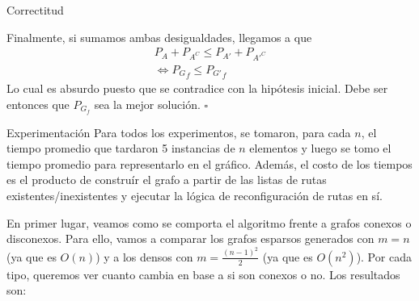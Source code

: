 \documentclass[a4paper]{article}
\begin{document}
\begin{subsection}{Correctitud}
\begin{itemize}
\begin{enumerate}[(a)]
    \end{enumerate}
\end{itemize}
Finalmente, si sumamos ambas desigualdades, llegamos a que 
\begin{align*}
	P_A + P_{A^C} \leq P_{A'} + P_{{A'}^C} \\ 
    \Leftrightarrow {P_G}_f \leq {P_{G'}}_f
\end{align*}
Lo cual es absurdo puesto que se contradice con la hip\'{o}tesis inicial. Debe ser entonces que $P_{G_f}$ sea la mejor soluci\'{o}n. $\square$

\end{subsection}

\begin{subsection}{Experimentaci\'{o}n}
Para todos los experimentos, se tomaron, para cada $n$, el tiempo promedio que tardaron 5 instancias de $n$ elementos y luego se tomo el tiempo promedio para representarlo en el gr\'{a}fico. Adem\'{a}s, el costo de los tiempos es el producto de constru\'{i}r el grafo a partir de las listas de rutas existentes/inexistentes y ejecutar la l\'{o}gica de reconfiguraci\'{o}n de rutas en s\'{i}.


En primer lugar, veamos como se comporta el algoritmo frente a grafos conexos o disconexos. Para ello, vamos a comparar los grafos 
esparsos generados con $m=n$ (ya que es $O(n)$) y a los densos con $m= \frac{(n-1)^2}{2}$ (ya que es $O(n^2)$). Por cada tipo, queremos ver cuanto cambia en base a si son conexos o no. Los resultados son:\\



\end{subsection}
\end{document}
